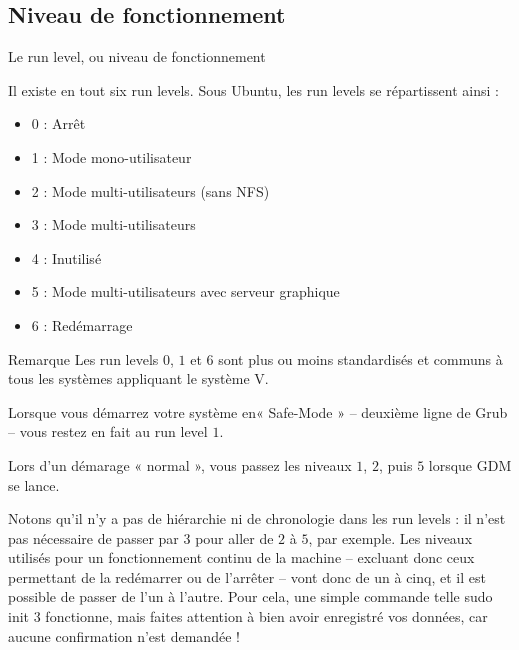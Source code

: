 \documentclass[10pt]{beamer}
\begin{document}
\subsection{Niveau de fonctionnement}
\begin{frame}{Le run level, ou niveau de fonctionnement}

Il existe en tout six run levels. Sous Ubuntu, les run levels se répartissent ainsi :
\begin{itemize}
\item 0 : Arrêt
\item 1 : Mode mono-utilisateur
\item 2 : Mode multi-utilisateurs (sans NFS)
\item 3 : Mode multi-utilisateurs
\item 4 : Inutilisé
\item 5 : Mode multi-utilisateurs avec serveur graphique
\item 6 : Redémarrage
\end{itemize}
\end{frame}

\begin{frame}
\begin{alertblock}{Remarque}
Les run levels $0$, $1$ et $6$ sont plus ou moins standardisés et communs à tous les
systèmes appliquant le système V. 

Lorsque vous démarrez votre système en« Safe-Mode » – deuxième ligne de Grub – vous restez en fait au run level $1$. 

Lors d'un démarage « normal », vous passez les niveaux $1$, $2$, puis $5$ lorsque GDM se lance.

Notons qu'il n'y a pas de hiérarchie ni de chronologie dans les run levels : il n'est
pas nécessaire de passer par $3$ pour aller de $2$ à $5$, par exemple. Les niveaux
utilisés pour un fonctionnement continu de la machine – excluant donc ceux
permettant de la redémarrer ou de l'arrêter – vont donc de un à cinq, et il est
possible de passer de l'un à l'autre. Pour cela, une simple commande telle sudo \alert{init} $3$ fonctionne, mais faites attention à bien avoir enregistré vos données, car aucune confirmation n'est demandée !
\end{alertblock}
\end{frame}
\end{document}
